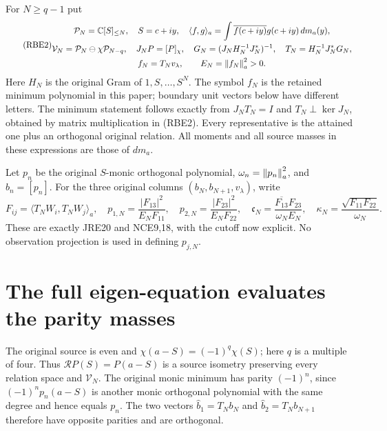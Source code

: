 For \(N\ge q-1\) put
\begin{equation}\tag{RBE2}
 \begin{gathered}
 \mathcal P_N=\mathbb C[S]_{\le N},\quad S=c+iy,\quad
 \langle f,g\rangle_a=\int\overline{f(c+iy)}g(c+iy)\,dm_a(y),\\
 \mathcal V_N=\mathcal P_N\ominus\chi\mathcal P_{N-q},\quad
 J_NP=[P]_\chi,\quad
 G_N=(J_NH_N^{-1}J_N^*)^{-1},\quad
 T_N=H_N^{-1}J_N^*G_N,\\
 f_N=T_Nv_\lambda,\qquad E_N=\left\lVert f_N\right\rVert_a^2>0.
 \end{gathered}
\end{equation}
Here \(H_N\) is the original Gram of \(1,S,\ldots,S^N\).
The symbol \(f_N\) is the retained minimum polynomial in this
paper; boundary unit vectors below have different letters.
The minimum statement follows exactly from
\(J_NT_N=I\) and \(T_N\perp\ker J_N\), obtained by matrix
multiplication in (RBE2). Every representative is the attained
one plus an orthogonal original relation. All moments and all
source masses in these expressions are those of \(dm_a\).

Let \(p_n\) be the original \(S\)-monic orthogonal polynomial,
\(\omega_n=\left\lVert p_n\right\rVert_a^2\), and \(b_n=[p_n]\).
For the three original columns \((b_N,b_{N+1},v_\lambda)\), write
\begin{equation}\tag{RBE3}
 F_{ij}=\langle T_NW_i,T_NW_j\rangle_a,\quad
 p_{1,N}=\frac{|F_{13}|^2}{E_NF_{11}},\quad
 p_{2,N}=\frac{|F_{23}|^2}{E_NF_{22}},\quad
 \mathfrak c_N=\frac{\overline{F_{13}}F_{23}}{\omega_NE_N},\quad
 \kappa_N=\frac{\sqrt{F_{11}F_{22}}}{\omega_N}.
\end{equation}
These are exactly JRE20 and NCE9,18, with the cutoff now explicit.
No observation projection is used in defining \(p_{j,N}\).

\section{The full eigen-equation evaluates the parity masses}

The original source is even and
\(\chi(a-S)=(-1)^q\chi(S)\); here \(q\) is a multiple of
four. Thus \(\mathcal R P(S)=P(a-S)\) is a source isometry
preserving every relation space and \(\mathcal V_N\).
The original monic minimum has parity \((-1)^n\), since
\((-1)^np_n(a-S)\) is another monic orthogonal polynomial
with the same degree and hence equals \(p_n\). The two vectors
\(\widehat b_1=T_Nb_N\) and \(\widehat b_2=T_Nb_{N+1}\)
therefore have opposite parities and are orthogonal.

